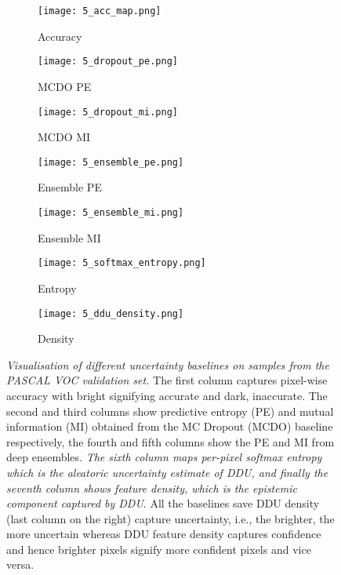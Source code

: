\documentclass{article}
\begin{document}
\begin{figure*}[t!]
    \begin{subfigure}{0.13\linewidth}
        \centering
        \texttt{[image: 5\_acc\_map.png]}
        \caption{Accuracy}
    \end{subfigure}
    \begin{subfigure}{0.13\linewidth}
        \centering
        \texttt{[image: 5\_dropout\_pe.png]}
        \caption{MCDO PE}
    \end{subfigure}
    \begin{subfigure}{0.13\linewidth}
        \centering
        \texttt{[image: 5\_dropout\_mi.png]}
        \caption{MCDO MI}
    \end{subfigure}
    \begin{subfigure}{0.13\linewidth}
        \centering
        \texttt{[image: 5\_ensemble\_pe.png]}
        \caption{Ensemble PE}
    \end{subfigure}
    \begin{subfigure}{0.13\linewidth}
        \centering
        \texttt{[image: 5\_ensemble\_mi.png]}
        \caption{Ensemble MI}
    \end{subfigure}
    \begin{subfigure}{0.13\linewidth}
        \centering
        \texttt{[image: 5\_softmax\_entropy.png]}
        \caption{Entropy}
    \end{subfigure}
    \begin{subfigure}{0.13\linewidth}
        \centering
        \texttt{[image: 5\_ddu\_density.png]}
        \caption{Density}
    \end{subfigure}
    \caption{
    \emph{Visualisation of different uncertainty baselines on samples from the PASCAL VOC validation set.} The first column captures pixel-wise accuracy with bright signifying accurate and dark, inaccurate. The second and third columns show predictive entropy (PE) and mutual information (MI) obtained from the MC Dropout (MCDO) baseline respectively, the fourth and fifth columns show the PE and MI from deep ensembles. \emph{The sixth column maps per-pixel softmax entropy which is the aleatoric uncertainty estimate of DDU, and finally the seventh column shows feature density, which is the epistemic component captured by DDU}. All the baselines save DDU density (last column on the right) capture uncertainty, i.e., the brighter, the more uncertain whereas DDU feature density captures confidence and hence brighter pixels signify more confident pixels and vice versa.
    }
    \label{fig:unc_vis}
\end{figure*}
\end{document}
